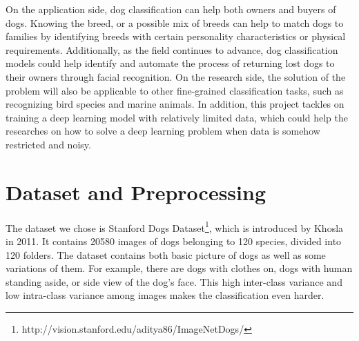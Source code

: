 \documentclass{article}
\begin{document}
On the application side, dog classification can help both owners and buyers of dogs. Knowing the breed, or a possible mix of breeds can help to match dogs to families by identifying breeds with certain personality characteristics or physical requirements. Additionally, as the field continues to advance, dog classification models could help identify and automate the process of returning lost dogs to their owners through facial recognition. On the research side, the solution of the problem will also be applicable to other fine-grained classification tasks, such as recognizing bird species and marine animals. In addition, this project tackles on training a deep learning model with relatively limited data, which could help the researches on how to solve a deep learning problem when data is somehow restricted and noisy.

\section{Dataset and Preprocessing}
The dataset we chose is Stanford Dogs Dataset\footnote{http://vision.stanford.edu/aditya86/ImageNetDogs/}, which is introduced by Khosla in 2011\cite{novel_dataset}. It contains 20580 images of dogs belonging to 120 species, divided into 120 folders. The dataset contains both basic picture of dogs as well as some variations of them. For example, there are dogs with clothes on, dogs with human standing aside, or side view of the dog’s face. This high inter-class variance and low intra-class variance among images makes the classification even harder.  
\end{document}
